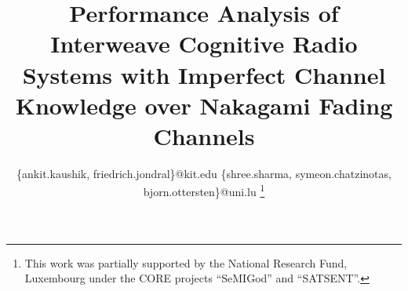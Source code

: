 \documentclass[conference, twocolumn]{IEEEtran}
\begin{document}
%
\title{Performance Analysis of Interweave Cognitive Radio Systems with Imperfect Channel Knowledge over Nakagami Fading Channels}
\author{
\{ankit.kaushik, friedrich.jondral\}@kit.edu
\{shree.sharma, symeon.chatzinotas, bjorn.ottersten\}@uni.lu
\thanks{This work was partially supported by the National Research Fund, Luxembourg under the CORE projects ``SeMIGod'' and ``SATSENT''.}
}

\maketitle
\thispagestyle{empty}
\pagestyle{empty}






\end{document}
